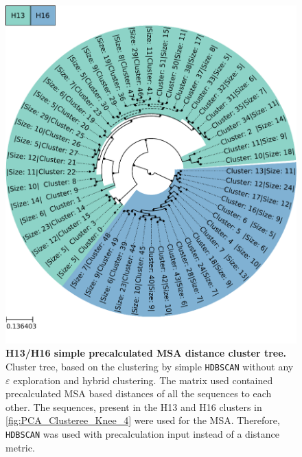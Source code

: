\begin{figure}[!hbt]
    \centering
    \includegraphics[width=\textwidth]{PCA/Clustertree_Segment_4_H_Focus.pdf}
    \caption[H13/H16 simple precalculated \gls{MSA} distance cluster tree]{\textbf{H13/H16 simple precalculated \gls{MSA} distance cluster tree.} Cluster tree, based on the clustering by simple \texttt{HDBSCAN} without any $\varepsilon$ exploration and hybrid clustering. The matrix used contained precalculated \gls{MSA} based distances of all the sequences to each other. The sequences, present in the H13 and H16 clusters in \autoref{fig:PCA_Clusteree_Knee_4} were used for the \gls{MSA}. Therefore, \texttt{HDBSCAN} was used with precalculation input instead of a distance metric.}
    \label{fig:Simple_Clustertree_MSA}
\end{figure}

